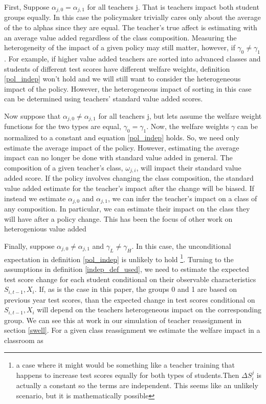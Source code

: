 \documentclass[12pt]{article}
\theoremstyle{definition}
\theoremstyle{definition}
\theoremstyle{definition}
\theoremstyle{definition}
\begin{document}
     First, Suppose $\alpha_{j,0} = \alpha_{j,1}$ for all teachers j. That is teachers impact both student groups equally. In this case the policymaker trivially cares only about the average of the to alphas since they are equal. The teacher's true affect is estimating with an average value added regardless of the class composition. Measuring the heterogeneity of the impact of a given policy may still matter, however, if $\gamma_0 \neq \gamma_1$. For example, if higher value added teachers are sorted into advanced classes and students of different test scores have different welfare weights, definition \ref{pol_indep} won't hold and we will still want to consider the heterogeneous impact of the policy. However, the heterogeneous impact of sorting in this case can be determined using teachers' standard value added scores.
     
    Now suppose that $\alpha_{j,0} \neq \alpha_{j,1}$ for all teachers j, but lets assume the welfare weight functions for the two types are equal, $\gamma_0 = \gamma_1$. Now, the welfare weights $\gamma$ can be normalized to a constant and equation \ref{pol_indep} holds. So, we need only estimate the average impact of the policy. However, estimating the average impact can no longer be done with standard value added in general. The composition of a given teacher's class, $\omega_{j,i}$, will impact their standard value added score. If the policy involves changing the class composition, the standard value added estimate for the teacher's impact after the change will be biased. If instead we estimate $\alpha_{j,0}$ and $\alpha_{j,1}$, we can infer the teacher's impact on a class of any composition. In particular, we can estimate their impact on the class they will have after a policy change. This has been the focus of other work on heterogenious value added \citep{ahn2021importance, Delgado2020}
    
    Finally, suppose $\alpha_{j,0} \neq \alpha_{j,1}$ and $\gamma_L \neq \gamma_H$. In this case, the unconditional expectation in definition \ref{pol_indep} is unlikely to hold \footnote{a case where it might would be something like a teacher training that happens to increase test scores equally for both types of students.Then $\Delta S_i^j$ is actually a constant so the terms are independent. This seems like an unlikely scenario, but it is mathematically possible}. Turning to the assumptions in definition \ref{indep_def_used}, we need to estimate the expected test score change for each student conditional on their observable characteristics $S_{i,t-1}, X_i$. If, as is the case in this paper, the groups 0 and 1 are based on previous year test scores, than the expected change in test scores conditional on $S_{i,t-1}, X_i$ will depend on the teachers heterogeneous impact on the corresponding group. We can see this at work in our simulation of teacher reassignment in section \ref{swell}. For a given class reassignment we estimate the welfare impact in a classroom as 
\end{document}
